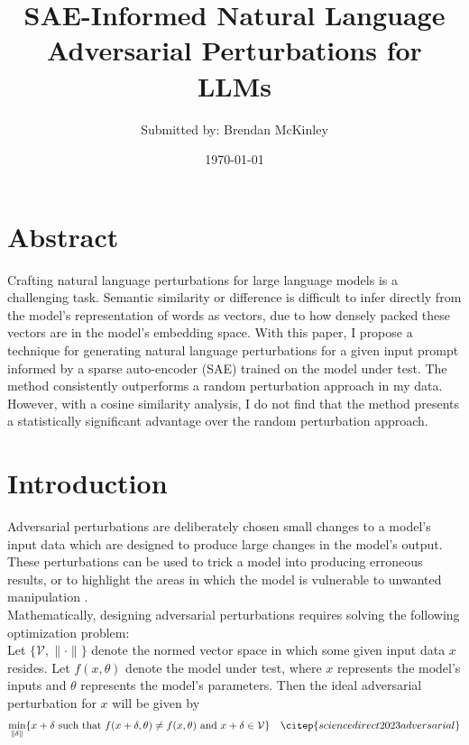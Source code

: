\documentclass{article}
\title{SAE-Informed Natural Language Adversarial Perturbations for LLMs}
\author{Submitted by: Brendan McKinley}
\date\today
\begin{document}
\maketitle 

\section*{Abstract}

Crafting natural language perturbations for large language models is a challenging task. Semantic similarity or difference is difficult to infer directly from the model's representation of words as vectors, due to how densely packed these vectors are in the model's embedding space. With this paper, I propose a technique for generating natural language perturbations for a given input prompt informed by a sparse auto-encoder (SAE) trained on the model under test. The method consistently outperforms a random perturbation approach in my data. However, with a cosine similarity analysis, I do not find that the method presents a statistically significant advantage over the random perturbation approach. 

\section*{Introduction}

Adversarial perturbations are deliberately chosen small changes to a model's input data which are designed to produce large changes in the model's output. These perturbations can be used to trick a model into producing erroneous results, or to highlight the areas in which the model is vulnerable to unwanted manipulation \citep{youtube2024video} \citep{adversarialrobustness2024}.\\ 

Mathematically, designing adversarial perturbations requires solving the following optimization problem:\\

Let $\{\mathcal{V}, \lVert \cdot \rVert\}$ denote the normed vector space in which some given input data $x$ resides. Let $f(x, \theta)$ denote the model under test, where $x$ represents the model's inputs and $\theta$ represents the model's parameters. Then the ideal adversarial perturbation for $x$ will be given by
\begin{align*}
\min\limits_{\lVert \delta \rVert}\{x + \delta \text{ such that } f(x + \delta, \theta) \ne f(x, \theta) \text{ and } x + \delta \in \mathcal{V}\} && \citep{sciencedirect2023adversarial}
\end{align*}
\end{document}

